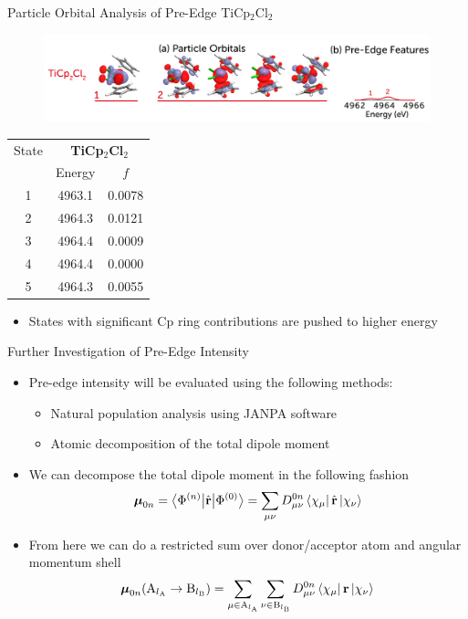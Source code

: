 \documentclass[t]{beamer}
\newcommand{\bra}[2][0]
{\ifthenelse{\equal{#1}{0}}{\left\langle #2 \right|}
{\ifthenelse{\equal{#1}{1}}{\big\langle #2 \big|}
{\ifthenelse{\equal{#1}{2}}{\Big\langle #2 \Big|}
{\ifthenelse{\equal{#1}{3}}{\bigg\langle #2 \bigg|}
{\ifthenelse{\equal{#1}{4}}{\Bigg\langle #2 \Bigg|}
{Error}}}}}
}
\newcommand{\ket}[2][0]
{\ifthenelse{\equal{#1}{0}}{\left| #2 \right\rangle}
{\ifthenelse{\equal{#1}{1}}{\big| #2 \big\rangle}
{\ifthenelse{\equal{#1}{2}}{\Big| #2 \Big\rangle}
{\ifthenelse{\equal{#1}{3}}{\bigg| #2 \bigg\rangle}
{\ifthenelse{\equal{#1}{4}}{\Bigg| #2 \Bigg\rangle}
{Error}}}}}
}
\begin{document}
\begin{frame}{Particle Orbital Analysis of Pre-Edge TiCp$_2$Cl$_2$}
 \begin{figure}
\includegraphics[scale=0.15]{ticp2cl2_preedge.png}
\end{figure}
\begin{table}
\footnotesize
\begin{tabular}{c@{\hskip 1in}c@{\hskip 1in}c}
\toprule
State &   \multicolumn{2}{c}{\textbf{TiCp$_2$Cl$_2$}}   \\
& Energy & $f$ \\
\cmidrule(r){2-3}
1 & 4963.1 & 0.0078\\
2 & 4964.3 & 0.0121\\
3 & 4964.4 & 0.0009\\
4 & 4964.4 & 0.0000\\
5 & 4964.3 & 0.0055\\
\bottomrule
\end{tabular}
\end{table}
\begin{itemize}
\item States with significant Cp ring contributions are pushed to higher energy
\end{itemize}
\end{frame}

\begin{frame}{Further Investigation of Pre-Edge Intensity}
\begin{itemize}
\item Pre-edge intensity will be evaluated using the following methods:
		\begin{itemize}
		\item Natural population analysis using JANPA software
		\item Atomic decomposition of the total dipole moment
		\end{itemize}
\item We can decompose the total dipole moment in the following fashion
\begin{equation}
\boldsymbol\mu_{0n} = \bra[1]{\Phi^{(n)}}\hat{\mathbf{r}} \ket[1]{\Phi^{(0)}} = \sum_{\mu\nu} D^{0n}_{\mu\nu} \bra{\chi_\mu} \hat{\mathbf{r}} \ket{\chi_\nu}
\end{equation}
\item From here we can do a restricted sum over donor/acceptor atom and angular momentum shell
\begin{equation}
\boldsymbol\mu_{0n} (\mathrm{A}_{l_\mathrm{A}} \rightarrow \mathrm{B}_{l_\mathrm{B}}) = \sum_{\mu \in \mathrm{A}_{l_\mathrm{A}}}\sum_{\nu \in \mathrm{B}_{l_\mathrm{B}}} D^{0n}_{\mu\nu} \bra{\chi_\mu} \mathbf{r} \ket{\chi_\nu}
\end{equation}
\end{itemize}
\end{frame}
\end{document}
